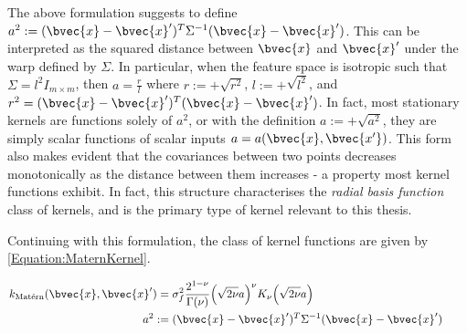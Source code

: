 				The above formulation suggests to define $a^{2} := (\bvec{x} - \bvec{x}')^{T} \Sigma^{-1} (\bvec{x} - \bvec{x}')$. This can be interpreted as the squared distance between $\bvec{x}$ and $\bvec{x}'$ under the warp defined by $\Sigma$. In particular, when the feature space is isotropic such that $\Sigma = l^{2} I_{m \times m}$, then $a = \frac{r}{l}$ where $r := +\sqrt{r^{2}}$, $l := +\sqrt{l^{2}}$, and $r^{2} = (\bvec{x} - \bvec{x}')^{T} (\bvec{x} - \bvec{x}')$. In fact, most stationary kernels are functions solely of $a^{2}$, or with the definition $a := +\sqrt{a^{2}}$, they are simply scalar functions of scalar inputs $a = a (\bvec{x}, \bvec{x'})$. This form also makes evident that the covariances between two points decreases monotonically as the distance between them increases - a property most kernel functions exhibit. In fact, this structure characterises the \textit{radial basis function} class of kernels, and is the primary type of kernel relevant to this thesis.
				
				Continuing with this formulation, the \matern class of kernel functions are given by \eqref{Equation:MaternKernel}.
				
				\begin{equation}
					\left.
						\begin{aligned}
							k_{\mathrm{\maternmath}}(\bvec{x}, \bvec{x}') =& \; \sigma_{f}^{2} \frac{2^{1 - \nu}}{\Gamma(\nu)} \Big( \sqrt{2 \nu} a \Big)^{\nu} K_{\nu}\Big( \sqrt{2 \nu} a \Big) \\
							a^{2} :=& \; (\bvec{x} - \bvec{x}')^{T} \Sigma^{-1} (\bvec{x} - \bvec{x}')
						\end{aligned}
					\qquad \right.
				\label{Equation:MaternKernel}
				\end{equation}
							
